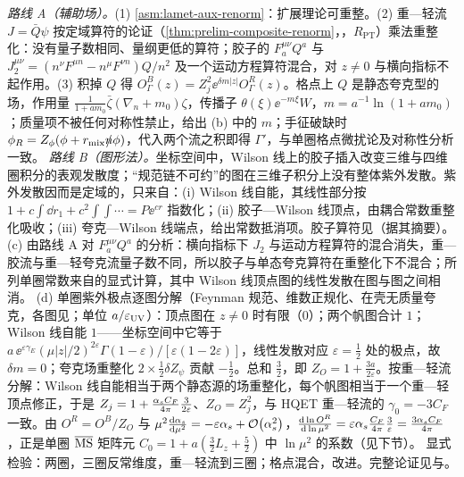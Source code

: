 \begin{proofsketch}
\emph{路线 A（辅助场\cite{Ji:2017oey,Green:2017xeu}）。}(1) \cref{asm:lamet-aux-renorm}：扩展理论可重整。(2) 重—轻流 $J=\bar Q\psi$ 按定域算符的论证（\cref{thm:prelim-composite-renorm}，\tagR，$R_{\mathrm{PT}}$）乘法重整化：没有量子数相同、量纲更低的算符；胶子的 $F^{\mu\nu}_aQ^a$ 与 $J_2^{\mu\nu}=(n^\nu F^{\mu n}-n^\mu F^{\nu n})Q/n^2$ 及一个运动方程算符混合\cite{Dorn:1986dt}，对 $z\neq0$ 与横向指标不起作用。(3) 积掉 $Q$ 得 $O^B_\Gamma(z)=Z_j^2\ee^{\delta m|z|}O^R_\Gamma(z)$。格点上 $Q$ 是静态夸克型的场，作用量 $\frac1{1+am_0}\bar\zeta(\nabla_n+m_0)\zeta$，传播子 $\theta(\xi)\ee^{-m\xi}W$，$m=a^{-1}\ln(1+am_0)$；质量项不被任何对称性禁止，给出 (b) 中的 $m$；手征破缺时 $\phi_R=Z_\phi(\phi+r_{\rm mix}\slashed{n}\phi)$，代入两个流之积即得 $\Gamma'$\cite{Green:2017xeu}，与单圈格点微扰论\cite{Constantinou:2017sej}及对称性分析\cite{Chen:2017mie}一致。
\emph{路线 B（图形法\cite{Ishikawa:2017faj}）。}坐标空间中，Wilson 线上的胶子插入改变三维与四维圈积分的表观发散度；“规范链不可约”的图在三维子积分上没有整体紫外发散。紫外发散因而是定域的，只来自：(i) Wilson 线自能，其线性部分按 $1+c\int\dd r_1+c^2\int\!\!\int\cdots=P\ee^{cr}$ 指数化；(ii) 胶子—Wilson 线顶点，由耦合常数重整化吸收\cite{Dotsenko:1979wb}；(iii) 夸克—Wilson 线端点，给出常数抵消项。胶子算符见\cite{Li:2018tpe,Zhang:2018diq}（据其摘要）。
(c) 由路线 A 对 $F^{\mu\nu}_aQ^a$ 的分析：横向指标下 $J_2$ 与运动方程算符的混合消失，重—胶流与重—轻夸克流量子数不同，所以胶子与单态夸克算符在重整化下不混合\cite{JiEtAl2021,Zhang:2018diq}；所列单圈常数来自\cite[第~III.A~节]{JiEtAl2021}的显式计算，其中 Wilson 线顶点图的线性发散在图与图之间相消。
(d) 单圈紫外极点逐图分解（Feynman 规范、维数正规化、在壳无质量夸克，各图见\cite[第~III~节]{IzubuchiEtAl2018}；单位 $a/\varepsilon_{\rm UV}$）：顶点图在 $z\neq0$ 时有限（$0$）；两个帆图合计 $1$；Wilson 线自能 $1$——坐标空间中它等于 $a\,\ee^{\varepsilon\gamma_E}(\mu|z|/2)^{2\varepsilon}\Gamma(1-\varepsilon)/[\varepsilon(1-2\varepsilon)]$，线性发散对应 $\varepsilon=\frac12$ 处的极点，故 $\delta m=0$；夸克场重整化 $2\times\frac12\delta Z_\psi$ 贡献 $-\frac12$。总和 $\frac32$，即 $Z_O=1+\frac{3a}{2\varepsilon}$。按重—轻流分解：Wilson 线自能相当于两个静态源的场重整化，每个帆图相当于一个重—轻顶点修正，于是 $Z_j=1+\frac{\alpha_s C_F}{4\pi}\frac3{2\varepsilon}$、$Z_O=Z_j^2$，与 HQET 重—轻流的 $\gamma_0=-3C_F$ 一致。由 $O^R=O^B/Z_O$ 与 $\mu^2\frac{\mathrm{d}\alpha_s}{\mathrm{d}\mu^2}=-\varepsilon\alpha_s+\mathcal{O}\!\left(\alpha_s^2\right)$，$\frac{\mathrm{d}\ln O^R}{\mathrm{d}\ln\mu^2}=\varepsilon\alpha_s\frac{C_F}{4\pi}\frac3\varepsilon=\frac{3\alpha_s C_F}{4\pi}$，正是单圈 $\overline{\mathrm{MS}}$ 矩阵元 $C_0=1+a(\frac32L_z+\frac52)$ 中 $\ln\mu^2$ 的系数（见下节）。
显式检验：两圈\cite{Ji:2015jwa}，三圈反常维度\cite{Braun:2020ymy}，重—轻流到三圈\cite{Chetyrkin:2003vi}；格点混合\cite{Constantinou:2017sej,Chen:2017mie}，改进\cite{Green:2020xco}。完整论证见\cite{Ji:2017oey,Ishikawa:2017faj}与\cite[第~III.A~节]{JiEtAl2021}。
\end{proofsketch}

